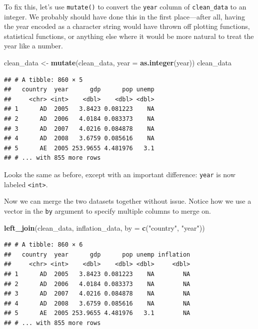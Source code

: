 \documentclass[12pt,oneside,openany]{book}
\newenvironment{Shaded}{\begin{snugshade}}{\end{snugshade}}
\newcommand{\KeywordTok}[1]{\textcolor[rgb]{0.13,0.29,0.53}{\textbf{#1}}}
\newcommand{\DataTypeTok}[1]{\textcolor[rgb]{0.13,0.29,0.53}{#1}}
\newcommand{\StringTok}[1]{\textcolor[rgb]{0.31,0.60,0.02}{#1}}
\newcommand{\NormalTok}[1]{#1}
\begin{document}
To fix this, let's use \texttt{mutate()} to convert the \texttt{year}
column of \texttt{clean\_data} to an integer. We probably should have
done this in the first place---after all, having the year encoded as a
character string would have thrown off plotting functions, statistical
functions, or anything else where it would be more natural to treat the
year like a number.

\begin{Shaded}
\begin{Highlighting}[]
\NormalTok{clean_data <-}\StringTok{ }\KeywordTok{mutate}\NormalTok{(clean_data,}
                     \DataTypeTok{year =} \KeywordTok{as.integer}\NormalTok{(year))}
\NormalTok{clean_data}
\end{Highlighting}
\end{Shaded}

\begin{verbatim}
## # A tibble: 860 × 5
##   country  year      gdp      pop unemp
##     <chr> <int>    <dbl>    <dbl> <dbl>
## 1      AD  2005   3.8423 0.081223    NA
## 2      AD  2006   4.0184 0.083373    NA
## 3      AD  2007   4.0216 0.084878    NA
## 4      AD  2008   3.6759 0.085616    NA
## 5      AE  2005 253.9655 4.481976   3.1
## # ... with 855 more rows
\end{verbatim}

Looks the same as before, except with an important difference:
\texttt{year} is now labeled \texttt{\textless{}int\textgreater{}}.

Now we can merge the two datasets together without issue. Notice how we
use a vector in the \texttt{by} argument to specify multiple columns to
merge on.

\begin{Shaded}
\begin{Highlighting}[]
\KeywordTok{left_join}\NormalTok{(clean_data,}
\NormalTok{          inflation_data,}
          \DataTypeTok{by =} \KeywordTok{c}\NormalTok{(}\StringTok{"country"}\NormalTok{, }\StringTok{"year"}\NormalTok{))}
\end{Highlighting}
\end{Shaded}

\begin{verbatim}
## # A tibble: 860 × 6
##   country  year      gdp      pop unemp inflation
##     <chr> <int>    <dbl>    <dbl> <dbl>     <dbl>
## 1      AD  2005   3.8423 0.081223    NA        NA
## 2      AD  2006   4.0184 0.083373    NA        NA
## 3      AD  2007   4.0216 0.084878    NA        NA
## 4      AD  2008   3.6759 0.085616    NA        NA
## 5      AE  2005 253.9655 4.481976   3.1        NA
## # ... with 855 more rows
\end{verbatim}
\end{document}
